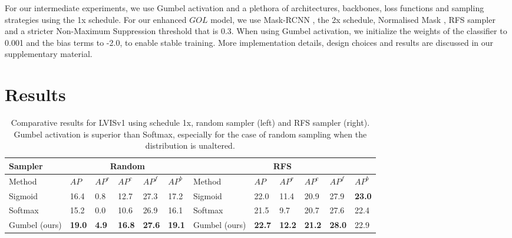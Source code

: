 \documentclass[runningheads]{llncs}
\begin{document}
For our intermediate experiments, we use Gumbel activation and a plethora of architectures, backbones, loss functions and sampling strategies using the 1x schedule. For our enhanced $GOL$ model, we use Mask-RCNN \cite{he2017mask}, the 2x schedule, Normalised Mask \cite{wang2021seesaw}, RFS sampler \cite{gupta2019lvis} and a stricter Non-Maximum Suppression threshold that is 0.3. When using Gumbel activation, we initialize the weights of the classifier to 0.001 and the bias terms to -2.0, to enable stable training. More implementation details, design choices and results are discussed in our supplementary material.




\section{Results}
\label{sec:experiments}



\begin{table*}[t]
\centering
\caption{Comparative results for LVISv1 using schedule 1x, random sampler (left) and RFS \cite{gupta2019lvis} sampler (right). Gumbel activation is superior than Softmax, especially for the case of random sampling when the distribution is unaltered.}
\label{my-label}
\begin{tabular}{l|l|l|l|l|l||l|l|l|l|l|l}

Sampler &
\multicolumn{5}{c||}{Random}&\multicolumn{6}{c}{RFS \cite{gupta2019lvis}}\\
\hline
Method &$AP$&$AP^r$&$AP^c$&$AP^f$&$AP^b$&Method &$AP$&$AP^r$&$AP^c$&$AP^f$&$AP^b$ \\
\hline
Sigmoid&16.4 &0.8 &12.7 &27.3 &17.2 & Sigmoid&22.0 &11.4 &20.9 &27.9 &\textbf{23.0}\\
Softmax &15.2 & 0.0& 10.6 &26.9&16.1& Softmax &21.5 & 9.7& 20.7 &27.6&22.4\\
Gumbel (ours) & \textbf{19.0}&\textbf{4.9}&\textbf{16.8}&\textbf{27.6}&\textbf{19.1}&Gumbel (ours) & \textbf{22.7}&\textbf{12.2}&\textbf{21.2}&\textbf{28.0}&22.9\\

\end{tabular}
\label{tab:samplers}
\end{table*}
\end{document}
